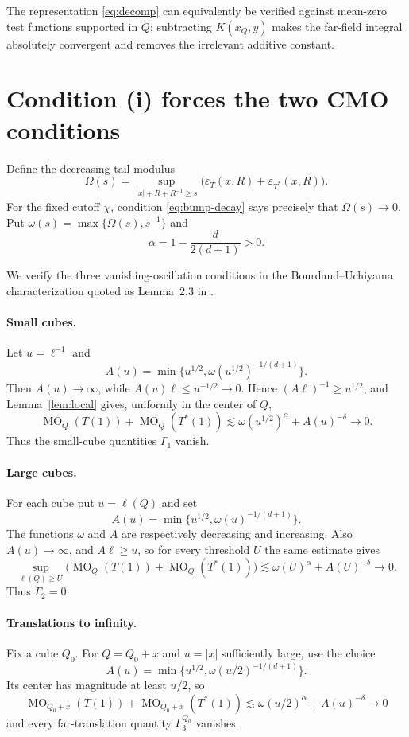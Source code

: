 \documentclass[11pt]{article}
\newcommand{\MO}{\operatorname{MO}}
\begin{document}
The representation \eqref{eq:decomp} can equivalently be verified against
mean-zero test functions supported in $Q$; subtracting $K(x_Q,y)$ makes the
far-field integral absolutely convergent and removes the irrelevant
additive constant.

\section{Condition (i) forces the two CMO conditions}

Define the decreasing tail modulus
\[
 \Omega(s)=\sup_{|x|+R+R^{-1}\geq s}
 \bigl(\varepsilon_T(x,R)+\varepsilon_{T^*}(x,R)\bigr).
\]
For the fixed cutoff $\chi$, condition \eqref{eq:bump-decay} says precisely
that $\Omega(s)\to0$.  Put
$\omega(s)=\max\{\Omega(s),s^{-1}\}$ and
\[
 \alpha=1-\frac{d}{2(d+1)}>0.
\]

We verify the three vanishing-oscillation conditions in the
Bourdaud--Uchiyama characterization quoted as Lemma~2.3 in \cite{BLOT}.

\paragraph{Small cubes.}
Let $u=\ell^{-1}$ and
\[
 A(u)=\min\{u^{1/2},\omega(u^{1/2})^{-1/(d+1)}\}.
\]
Then $A(u)\to\infty$, while $A(u)\ell\leq u^{-1/2}\to0$.  Hence
$(A\ell)^{-1}\geq u^{1/2}$, and Lemma~\ref{lem:local} gives, uniformly in
the center of $Q$,
\[
 \MO_Q(T(1)) + \MO_Q(T^*(1))
 \lesssim \omega(u^{1/2})^\alpha+A(u)^{-\delta}\longrightarrow0.
\]
Thus the small-cube quantities $\Gamma_1$ vanish.

\paragraph{Large cubes.}
For each cube put $u=\ell(Q)$ and set
\[
 A(u)=\min\{u^{1/2},\omega(u)^{-1/(d+1)}\}.
\]
The functions $\omega$ and $A$ are respectively decreasing and increasing.
Also $A(u)\to\infty$, and $A\ell\geq u$, so for every threshold $U$ the
same estimate gives
\[
 \sup_{\ell(Q)\geq U}
 \bigl(\MO_Q(T(1))+\MO_Q(T^*(1))\bigr)
 \lesssim \omega(U)^\alpha+A(U)^{-\delta}\longrightarrow0.
\]
Thus $\Gamma_2=0$.

\paragraph{Translations to infinity.}
Fix a cube $Q_0$.  For $Q=Q_0+x$ and $u=|x|$ sufficiently large, use the
choice
\[
 A(u)=\min\{u^{1/2},\omega(u/2)^{-1/(d+1)}\}.
\]
Its center has magnitude at least $u/2$, so
\[
 \MO_{Q_0+x}(T(1))+\MO_{Q_0+x}(T^*(1))
 \lesssim \omega(u/2)^\alpha+A(u)^{-\delta}\longrightarrow0
\]
and every far-translation quantity $\Gamma_3^{Q_0}$ vanishes.
\end{document}
